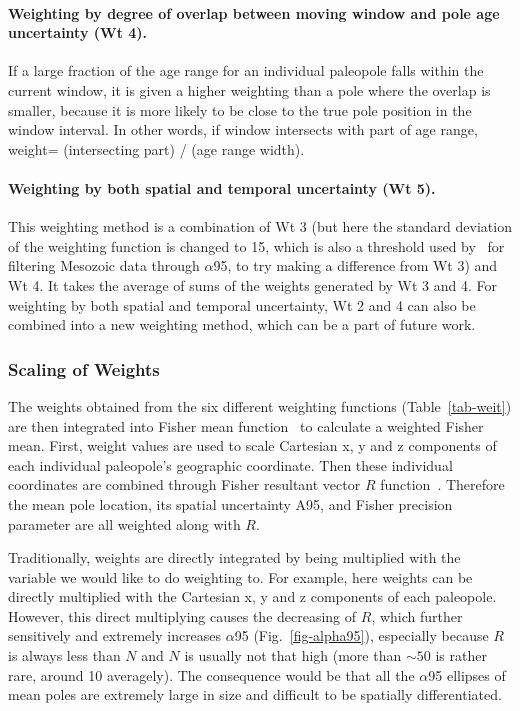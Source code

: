 \paragraph{Weighting by degree of overlap between moving window and pole age
uncertainty (Wt 4).} If a large fraction of the age range for an individual
paleopole falls within the current window, it is given a higher weighting than a
pole where the overlap is smaller, because it is more likely to be close to the
true pole position in the window interval. In other words, if window intersects
with part of age range, weight= (intersecting part) / (age range width).

\paragraph{Weighting by both spatial and temporal uncertainty (Wt 5).} This
weighting method is a combination of Wt 3 (but here the standard deviation of
the weighting function is changed to 15, which is also a threshold used
by~\citet{B02} for filtering Mesozoic data through $\alpha$95, to try making a
difference from Wt 3) and Wt 4. It takes the average of sums of the weights
generated by Wt 3 and 4. For weighting by both spatial and temporal uncertainty,
Wt 2 and 4 can also be combined into a new weighting method, which can be a part
of future work.

\subsubsection{Scaling of Weights}

The weights obtained from the six different weighting functions
(Table~\ref{tab-weit}) are then integrated into Fisher mean function~\citep{F53}
to calculate a weighted Fisher mean. First, weight values are used to scale
Cartesian x, y and z components of each individual paleopole's geographic
coordinate. Then these individual coordinates are combined through Fisher
resultant vector $R$ function~\citep[see][chap.~11]{T20}. Therefore the mean
pole location, its spatial uncertainty A95, and Fisher precision parameter are
all weighted along with $R$.

Traditionally, weights are directly integrated by being multiplied with the
variable we would like to do weighting to. For example, here weights can be
directly multiplied with the Cartesian x, y and z components of each paleopole.
However, this direct multiplying causes the decreasing of $R$, which further
sensitively and extremely increases $\alpha$95 (Fig.~\ref{fig-alpha95}),
especially because $R$ is always less than $N$ and $N$ is usually not that high
(more than ${\sim}50$ is rather rare, around 10 averagely). The consequence
would be that all the $\alpha$95 ellipses of mean poles are extremely large in
size and difficult to be spatially differentiated.

